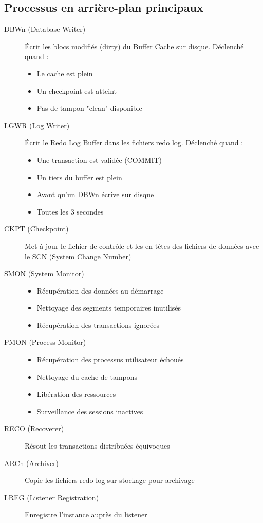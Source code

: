 \documentclass[12pt,a4paper]{article}
\begin{document}
\subsection{Processus en arrière-plan principaux}

\begin{description}
    \item[DBWn (Database Writer)] Écrit les blocs modifiés (dirty) du Buffer Cache sur disque. Déclenché quand :
    \begin{itemize}
        \item Le cache est plein
        \item Un checkpoint est atteint
        \item Pas de tampon "clean" disponible
    \end{itemize}
    
    \item[LGWR (Log Writer)] Écrit le Redo Log Buffer dans les fichiers redo log. Déclenché quand :
    \begin{itemize}
        \item Une transaction est validée (COMMIT)
        \item Un tiers du buffer est plein
        \item Avant qu'un DBWn écrive sur disque
        \item Toutes les 3 secondes
    \end{itemize}
    
    \item[CKPT (Checkpoint)] Met à jour le fichier de contrôle et les en-têtes des fichiers de données avec le SCN (System Change Number)
    
    \item[SMON (System Monitor)] 
    \begin{itemize}
        \item Récupération des données au démarrage
        \item Nettoyage des segments temporaires inutilisés
        \item Récupération des transactions ignorées
    \end{itemize}
    
    \item[PMON (Process Monitor)]
    \begin{itemize}
        \item Récupération des processus utilisateur échoués
        \item Nettoyage du cache de tampons
        \item Libération des ressources
        \item Surveillance des sessions inactives
    \end{itemize}
    
    \item[RECO (Recoverer)] Résout les transactions distribuées équivoques
    
    \item[ARCn (Archiver)] Copie les fichiers redo log sur stockage pour archivage
    
    \item[LREG (Listener Registration)] Enregistre l'instance auprès du listener
\end{description}
\end{document}
